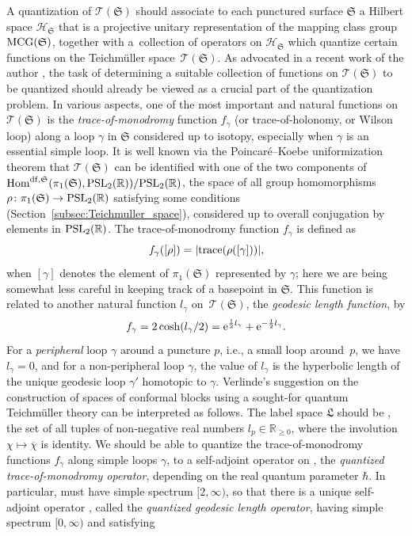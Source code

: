\documentclass[pdftex]{sigma}
\numberwithin{equation}{section}
\theoremstyle{definition}
\newcommand{\ol}[1]{\overline{#1}}
\begin{document}
A quantization of $\mathscr{T}(\mathfrak{S})$ should associate to each punctured surface $\mathfrak{S}$ a Hilbert space $\mathscr{H}_\mathfrak{S}$ that is a projective unitary representation of the mapping class group ${\rm MCG}(\mathfrak{S})$, together with a~collection of operators on $\mathscr{H}_\mathfrak{S}$ which quantize certain functions on the Teichm\"uller space~$\mathscr{T}(\mathfrak{S})$. As advocated in a recent work of the author \cite{KS}, the task of determining a suitable collection of functions on $\mathscr{T}(\mathfrak{S})$ to be quantized should already be viewed as a crucial part of the quantization problem. In various aspects, one of the most important and natural functions on $\mathscr{T}(\mathfrak{S})$ is the {\em trace-of-monodromy} function $f_\gamma$ (or trace-of-holonomy, or Wilson loop) along a loop $\gamma$ in $\mathfrak{S}$ considered up to isotopy, especially when $\gamma$ is an essential simple loop. It is well known via the Poincar\'e--Koebe uniformization theorem that $\mathscr{T}(\mathfrak{S})$ can be identified with one of the two components of ${\rm Hom}^{{\rm df},\mathfrak{S}}(\pi_1(\mathfrak{S}), {\rm PSL}_2(\mathbb{R}))/{\rm PSL}_2(\mathbb{R})$, the space of all group homomorphisms $\rho\colon \pi_1(\mathfrak{S}) \to {\rm PSL}_2(\mathbb{R})$ satisfying some conditions (Section~\ref{subsec:Teichmuller_space}), considered up to overall conjugation by elements in ${\rm PSL}_2(\mathbb{R})$. The trace-of-monodromy function $f_\gamma$ is defined as
\[
f_\gamma([\rho]) = |{\rm trace}(\rho([\gamma]))|,
\]
when $[\gamma]$ denotes the element of $\pi_1(\mathfrak{S})$ represented by $\gamma$; here we are being somewhat less careful in keeping track of a basepoint in $\mathfrak{S}$. This function is related to another natural function $l_\gamma$ on~$\mathscr{T}(\mathfrak{S})$, the {\em geodesic length function}, by
\[
f_\gamma = 2\cosh(l_\gamma/2) = {\rm e}^{\frac{1}{2} l_\gamma} + {\rm e}^{-\frac{1}{2} l_\gamma}.
\]
For a {\em peripheral} loop $\gamma$ around a puncture $p$, i.e., a small loop around~$p$, we have $l_\gamma=0$, and for a non-peripheral loop $\gamma$, the value of $l_\gamma$ is the hyperbolic length of the unique geodesic loop $\gamma'$ homotopic to $\gamma$.
Verlinde's suggestion on the construction of spaces of conformal blocks using a sought-for quantum Teichm\"uller theory can be interpreted as follows. The label space $\mathfrak{L}$ should be , the set of all tuples  of non-negative real numbers $l_p \in \mathbb{R}_{\ge 0}$, where the involution $\chi \mapsto \ol{\chi}$ is identity. We should be able to quantize the trace-of-monodromy functions $f_\gamma$ along simple loops $\gamma$, to a self-adjoint operator  on , the {\em quantized trace-of-monodromy operator}, depending on the real quantum parameter $\hbar$. In particular,  must have simple spectrum $[2,\infty)$, so that there is a unique self-adjoint operator , called the {\em quantized geodesic length operator}, having simple spectrum $[0,\infty)$ and satisfying
\end{document}
